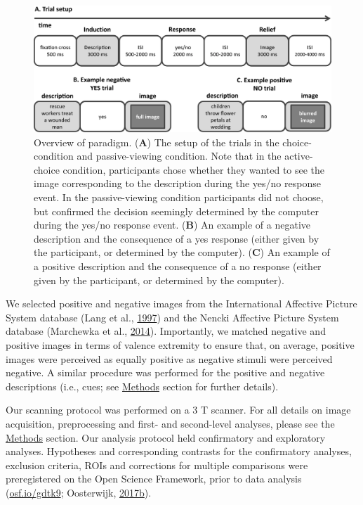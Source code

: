\documentclass[12pt,american,a4paper,oneside,]{memoir} %
\begin{document}
\begin{figure}
\centering
\includegraphics{_bookdown_files/morbid-curiosity-files/figures/figure_1.pdf}
\caption{\label{fig:fig-morbid-curiosity-1}Overview of paradigm. (\textbf{A}) The setup of the trials in the choice-condition and passive-viewing condition. Note that in the active-choice condition, participants chose whether they wanted to see the image corresponding to the description during the yes/no response event. In the passive-viewing condition participants did not choose, but confirmed the decision seemingly determined by the computer during the yes/no response event. (\textbf{B}) An example of a negative description and the consequence of a yes response (either given by the participant, or determined by the computer). (\textbf{C}) An example of a positive description and the consequence of a no response (either given by the participant, or determined by the computer).}
\end{figure}



We selected positive and negative images from the International Affective Picture System database (Lang et al., \protect\hyperlink{ref-lang1997international}{1997}) and the Nencki Affective Picture System database (Marchewka et al., \protect\hyperlink{ref-marchewka2014nencki}{2014}). Importantly, we matched negative and positive images in terms of valence extremity to ensure that, on average, positive images were perceived as equally positive as negative stimuli were perceived negative. A similar procedure was performed for the positive and negative descriptions (i.e., cues; see \protect\hyperlink{morbid-curiosity-methods}{Methods} section for further details).

Our scanning protocol was performed on a 3 T scanner. For all details on image acquisition, preprocessing and first- and second-level analyses, please see the \protect\hyperlink{morbid-curiosity-methods}{Methods} section. Our analysis protocol held confirmatory and exploratory analyses. Hypotheses and corresponding contrasts for the confirmatory analyses, exclusion criteria, ROIs and corrections for multiple comparisons were preregistered on the Open Science Framework, prior to data analysis (\url{osf.io/gdtk9}; Oosterwijk, \protect\hyperlink{ref-oosterwijk2017prereg}{2017}\protect\hyperlink{ref-oosterwijk2017prereg}{b}).
\end{document}
